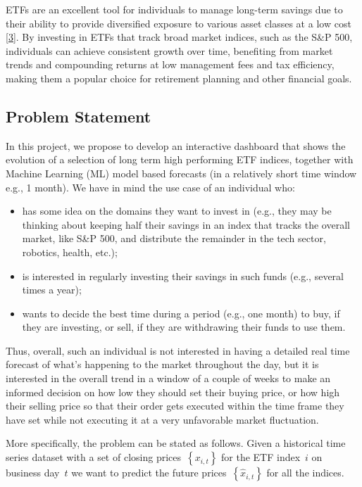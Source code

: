 \documentclass[10pt]{article}
\providecommand{\tightlist}{\setlength{\itemsep}{0pt}\setlength{\parskip}{0pt}}%
\begin{document}
ETFs are an excellent tool for individuals to manage long-term savings
due to their ability to provide diversified exposure to various asset
classes at a low cost \hyperref[csl:3]{[3]}. By investing in ETFs that
track broad market indices, such as the S\&P 500, individuals can
achieve consistent growth over time, benefiting from market trends and
compounding returns at low management fees and tax efficiency, making
them a popular choice for retirement planning and other financial goals.

\hypertarget{problem-statement}{%
\subsection{Problem Statement}}

{\label{635437}}

In this project, we propose to develop an interactive dashboard that
shows the evolution of a selection of long term high performing ETF
indices, together with Machine Learning (ML) model based forecasts (in a
relatively short time window e.g., 1 month). We have in mind the use
case of an individual who:

\begin{itemize}
\tightlist
\item
  has some idea on the domains they want to invest in (e.g., they may be
  thinking about keeping half their savings in an index that tracks the
  overall market, like S\&P 500, and distribute the remainder in the
  tech sector, robotics, health, etc.);
\item
  is interested in regularly investing their savings in such funds
  (e.g., several times a year);
\item
  wants to decide the best time during a period (e.g., one month) to
  buy, if they are investing, or sell, if they are withdrawing their
  funds to use them.
\end{itemize}

Thus, overall, such an individual is not interested in having a detailed
real time forecast of what's happening to the market throughout the day,
but it is interested in the overall trend in a window of a couple of
weeks to make an informed decision on how low they should set their
buying price, or how high their selling price so that their order gets
executed within the time frame they have set while not executing it at a
very unfavorable market fluctuation.

More specifically, the problem can be stated as follows. Given a
historical time series dataset with a set of closing
prices~\(\left\{x_{i,t}\right\}\) for the ETF index~\(i\) on
business day~\(t\) we want to predict the future
prices~\(\left\{\hat{x}_{i, t}\right\}\) for all the indices.~~
\end{document}
